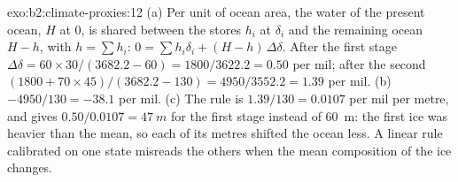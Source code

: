 \begin{solution}{exo:b2:climate-proxies:12}
(a) Per unit of ocean area, the water of the present ocean, $H$ at 0, is shared between the stores
$h_i$ at $\delta_i$ and the remaining ocean $H - h$, with $h = \sum h_i$: $0 = \sum h_i\delta_i +
(H - h)\,\Delta\delta$. After the first stage $\Delta\delta = 60 \times 30/(3682.2 - 60) =
1800/3622.2 = 0.50$ per mil; after the second $(1800 + 70 \times 45)/(3682.2 - 130) =
4950/3552.2 = 1.39$ per mil. (b) $-4950/130 = -38.1$ per mil. (c) The rule is $1.39/130 = 0.0107$
per mil per metre, and gives $0.50/0.0107 = \qty{47}{m}$ for the first stage instead of
\qty{60}{m}: the first ice was heavier than the mean, so each of its metres shifted the ocean
less. A linear rule calibrated on one state misreads the others when the mean composition of the
ice changes.
\end{solution}

